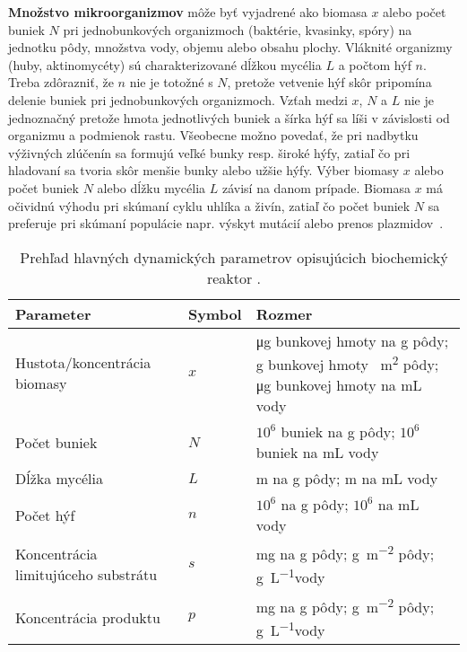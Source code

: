 \textbf{Množstvo mikroorganizmov} môže byť vyjadrené ako biomasa $x$ alebo počet buniek $N$ pri jednobunkových organizmoch (baktérie, kvasinky, spóry) na jednotku pôdy, množstva vody, objemu alebo obsahu plochy. Vláknité organizmy (huby, aktinomycéty) sú charakterizované dĺžkou mycélia $L$ a počtom hýf $n$. Treba zdôrazniť, že $n$ nie je totožné s $N$, pretože vetvenie hýf skôr pripomína delenie buniek pri jednobunkových organizmoch. Vzťah medzi $x$, $N$ a $L$ nie je jednoznačný pretože hmota jednotlivých buniek a šírka hýf sa líši v závislosti od organizmu a podmienok rastu. Všeobecne možno povedať, že pri nadbytku výživných zlúčenín sa formujú veľké bunky resp. široké hýfy, zatiaľ čo pri hladovaní sa tvoria skôr menšie bunky alebo užšie hýfy. Výber biomasy $x$ alebo počet buniek $N$ alebo dĺžku mycélia $L$ závisí na danom prípade. Biomasa $x$ má očividnú výhodu pri skúmaní cyklu uhlíka a živín, zatiaľ čo počet buniek $N$ sa preferuje pri skúmaní populácie napr. výskyt mutácií alebo prenos plazmidov~\cite{panikov:kinetics_MO_processes:2016}.

\begin{table}
	\centering
	\caption{Prehľad hlavných dynamických parametrov opisujúcich biochemický reaktor \cite{panikov:kinetics_MO_processes:2016}.}
	\label{tab:chemostat_dyn_param}
	\begin{tabular}{p{5cm} p{1.9cm} p{4cm}}
		\hline
		\textbf{Parameter} & \textbf{Symbol} & \textbf{Rozmer} \\ 
		\hline
		Hustota/koncentrácia biomasy & $x$ & \si{\micro\gram} bunkovej hmoty na \si{\gram} pôdy; \si{\gram} bunkovej hmoty \si{\per\square\meter} pôdy; \si{\micro\gram} bunkovej hmoty na \si{\milli\liter} vody\\
		Počet buniek & $N$ & $10^{6}$ buniek na \si{\gram} pôdy; $10^{6}$ buniek na \si{\milli\liter} vody\\
		Dĺžka mycélia & $ L $ & \si{\meter} na \si{\gram} pôdy; \si{\meter} na \si{\milli\liter} vody\\
		Počet hýf & $n$ & $10^{6}$ na \si{\gram} pôdy; $10^{6}$ na \si{\milli\liter} vody\\
		Koncentrácia limitujúceho substrátu & $s$ & \si{\milli\gram} na \si{\gram} pôdy; \si{\gram\per\square\meter} pôdy; \si{\gram\per\liter}vody\\
		Koncentrácia produktu & $p$ & \si{\milli\gram} na \si{\gram} pôdy; \si{\gram\per\square\meter} pôdy; \si{\gram\per\liter}vody\\
		\hline	
	\end{tabular}
\end{table}

